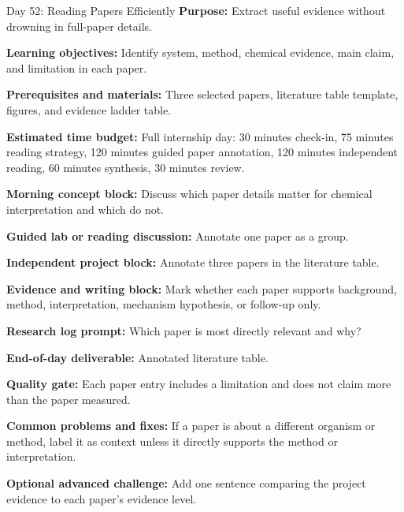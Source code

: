 \begin{dailybox}{Day 52: Reading Papers Efficiently}
\textbf{Purpose:} Extract useful evidence without drowning in full-paper details.

\textbf{Learning objectives:} Identify system, method, chemical evidence, main claim, and limitation in each paper.

\textbf{Prerequisites and materials:} Three selected papers, literature table template, figures, and evidence ladder table.

\textbf{Estimated time budget:} Full internship day: 30 minutes check-in, 75 minutes reading strategy, 120 minutes guided paper annotation, 120 minutes independent reading, 60 minutes synthesis, 30 minutes review.

\textbf{Morning concept block:} Discuss which paper details matter for chemical interpretation and which do not.

\textbf{Guided lab or reading discussion:} Annotate one paper as a group.

\textbf{Independent project block:} Annotate three papers in the literature table.

\textbf{Evidence and writing block:} Mark whether each paper supports background, method, interpretation, mechanism hypothesis, or follow-up only.

\textbf{Research log prompt:} Which paper is most directly relevant and why?

\textbf{End-of-day deliverable:} Annotated literature table.

\textbf{Quality gate:} Each paper entry includes a limitation and does not claim more than the paper measured.

\textbf{Common problems and fixes:} If a paper is about a different organism or method, label it as context unless it directly supports the method or interpretation.

\textbf{Optional advanced challenge:} Add one sentence comparing the project evidence to each paper's evidence level.
\end{dailybox}

